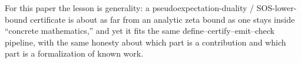 For this paper the lesson is generality: a pseudoexpectation-duality / SOS-lower-bound
certificate is about as far from an analytic zeta bound as one stays inside
``concrete mathematics,'' and yet it fits the same define--certify--emit--check
pipeline, with the same honesty about which part is a contribution and which part
is a formalization of known work.

